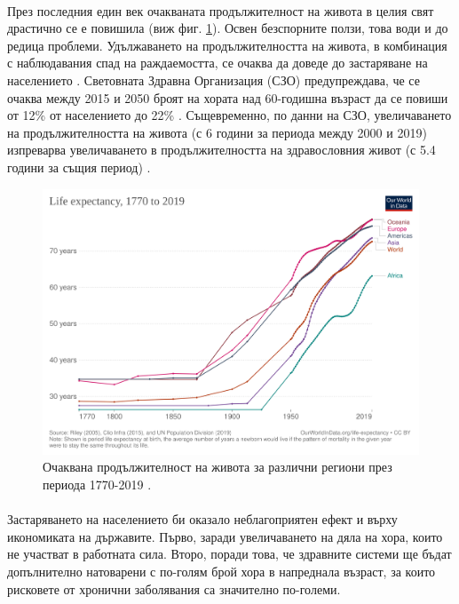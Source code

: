 \documentclass[pdftex,cyrillic,14pt,a4page,twoside,openright]{extreport}
\begin{document}
\paragraph{}
През последния един век очакваната продължителност на живота в целия свят драстично се е повишила \cite{zijdeman2016} (виж фиг. \ref{fig:life_expectancy}). Освен безспорните ползи, това води и до редица проблеми. Удължаването на продължителността на живота, в комбинация с наблюдавания спад на раждаемостта, се очаква да доведе до застаряване на населението \cite{lutz2008}. Световната Здравна Организация (СЗО) предупреждава, че се очаква между 2015 и 2050 броят на хората над 60-годишна възраст да се повиши от 12\% от населението до 22\% \cite{who_report_ageing2015}. Същевременно, по данни на СЗО, увеличаването на продължителността на живота (с 6 години за периода между 2000 и 2019) изпреварва увеличаването в продължителността на здравословния живот (с 5.4 години за същия период) \cite{who_health2020}. \\
\begin{figure}[h]
  \centering
  \includegraphics[width=12cm]{figures/life-expectancy}
  \caption {Очаквана продължителност на живота за различни региони през периода 1770-2019 \cite{zijdeman2016}.}
  \label{fig:life_expectancy}
\end{figure}

\paragraph{}
Застаряването на населението би оказало неблагоприятен ефект и върху икономиката на държавите. Първо, заради увеличаването на дяла на хора, които не участват в работната сила. Второ, поради това, че здравните системи ще бъдат допълнително натоварени с по-голям брой хора в напреднала възраст, за които рисковете от хронични заболявания са значително по-големи.
\end{document}
